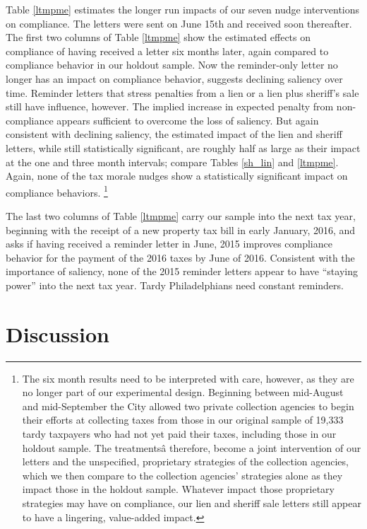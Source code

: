 Table \ref{ltmpme} estimates the longer run impacts of our seven nudge
interventions on compliance.  The letters were sent on June 15th and
received soon thereafter.  The first two columns of Table \ref{ltmpme}
show the estimated effects on compliance of having received a letter
six months later, again compared to compliance behavior in our holdout
sample.  Now the reminder-only letter no longer has an impact on
compliance behavior, suggests declining saliency over time.  Reminder
letters that stress penalties from a lien or a lien plus sheriff's
sale still have influence, however.  The implied increase in expected
penalty from non-compliance appears sufficient to overcome the loss of
saliency.  But again consistent with declining saliency, the estimated
impact of the lien and sheriff letters, while still statistically
significant, are roughly half as large as their impact at the one and
three month intervals; compare Tables \ref{sh_lin} and \ref{ltmpme}.
Again, none of the tax morale nudges show a statistically significant
impact on compliance behaviors. \footnote{The six month results need
  to be interpreted with care, however, as they are no longer part of
  our experimental design.  Beginning between mid-August and
  mid-September the City allowed two private collection agencies to
  begin their efforts at collecting taxes from those in our original
  sample of 19,333 tardy taxpayers who had not yet paid their taxes,
  including those in our holdout sample.  The treatmentsâ therefore,
  become a joint intervention of our letters and the unspecified,
  proprietary strategies of the collection agencies, which we then
  compare to the collection agencies' strategies alone as they impact
  those in the holdout sample.  Whatever impact those proprietary
  strategies may have on compliance, our lien and sheriff sale letters
  still appear to have a lingering, value-added impact.}

The last two columns of Table \ref{ltmpme} carry our sample into the
next tax year, beginning with the receipt of a new property tax bill
in early January, 2016, and asks if having received a reminder letter
in June, 2015 improves compliance behavior for the payment of the 2016
taxes by June of 2016.  Consistent with the importance of saliency,
none of the 2015 reminder letters appear to have ``staying power'' into
the next tax year.  Tardy Philadelphians need constant reminders.

\section{Discussion}

